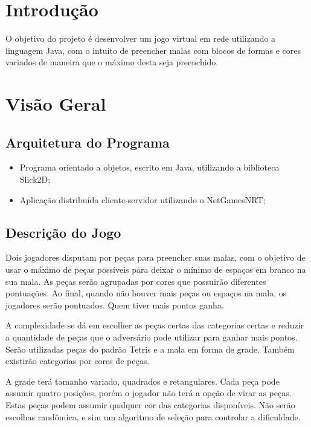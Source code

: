 \documentclass[
	12pt,	
	openany,			
	oneside,			
	a4paper,			
	english,			
	french,			
	spanish,			
	brazil,	
	]{abntex2}
\begin{document}
 
\frenchspacing
\imprimircapa

\tableofcontents*
\cleardoublepage
\textual

\chapter*[Introdução]{Introdução}
 
O objetivo do projeto é desenvolver um jogo virtual em rede utilizando a linguagem Java, 
com o intuito de preencher malas com blocos de formas e cores variados de maneira que o máximo desta seja preenchido.

\chapter{Visão Geral}
 
\section{Arquitetura do Programa}
\begin{itemize}
\item Programa orientado a objetos, escrito em Java, utilizando a biblioteca Slick2D;
\item Aplicação distribuída cliente-servidor utilizando o NetGamesNRT;
\end{itemize}

\section{Descrição do Jogo}

Dois jogadores disputam por peças para preencher suas malas, com o objetivo de usar o máximo de peças possíveis para deixar o mínimo de espaços em branco na sua mala. As peças serão agrupadas por cores que possuirão diferentes pontuações. Ao final, quando não houver mais peças ou espaços na mala, os jogadores serão pontuados. Quem tiver mais pontos ganha.

A complexidade se dá em escolher as peças certas das categorias certas e reduzir a quantidade de peças que o adversário pode utilizar para ganhar mais pontos. Serão utilizadas peças do padrão Tetris e a mala em forma de grade. Também existirão categorias por cores de peças. 

A grade terá tamanho variado, quadrados e retangulares. Cada peça pode assumir quatro posições, porém o jogador não terá a opção de virar as peças. Estas peças podem assumir qualquer cor das categorias disponíveis. Não serão escolhas randômica, e sim um algoritmo de seleção para controlar a dificuldade.
\end{document}
